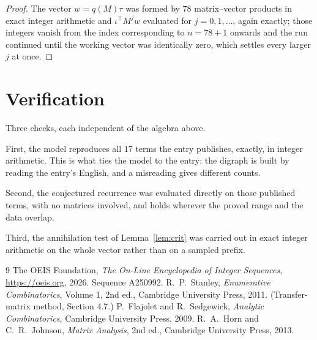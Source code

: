 \documentclass[11pt,a4paper]{article}
\theoremstyle{plain}
\theoremstyle{definition}
\begin{document}
\begin{proof}
The vector $w=q(M)\tau$ was formed by $78$ matrix--vector products in exact integer
arithmetic and $\iota^{\!\top}M^{j}w$ evaluated for $j=0,1,\dots$, again exactly; those
integers vanish from the index corresponding to $n=78+1$ onwards and the run continued
until the working vector was identically zero, which settles every larger $j$ at once.
\end{proof}

\section{Verification}

Three checks, each independent of the algebra above.

First, the model reproduces all $17$ terms the entry publishes, exactly, in integer
arithmetic. This is what ties the model to the entry: the digraph is built by reading the
entry's English, and a misreading gives different counts.

Second, the conjectured recurrence was evaluated directly on those published terms, with no
matrices involved, and holds wherever the proved range and the data overlap.

Third, the annihilation test of Lemma~\ref{lem:crit} was carried out in exact integer
arithmetic on the whole vector rather than on a sampled prefix.

\begin{thebibliography}{9}
 The OEIS Foundation, \emph{The On-Line Encyclopedia of Integer
Sequences}, \url{https://oeis.org}, 2026. Sequence A250992.
 R.~P.~Stanley, \emph{Enumerative Combinatorics}, Volume 1, 2nd ed.,
Cambridge University Press, 2011. (Transfer-matrix method, Section 4.7.)
 P.~Flajolet and R.~Sedgewick, \emph{Analytic Combinatorics}, Cambridge
University Press, 2009.
 R.~A.~Horn and C.~R.~Johnson, \emph{Matrix Analysis}, 2nd ed., Cambridge
University Press, 2013.
\end{thebibliography}
\end{document}
